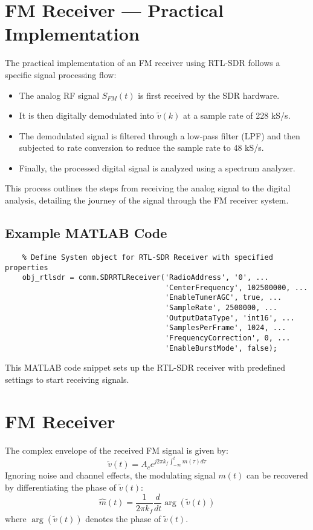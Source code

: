 \section*{FM Receiver — Practical Implementation}

The practical implementation of an FM receiver using RTL-SDR follows a specific signal processing flow:
\begin{itemize}
    \item The analog RF signal \( S_{FM}(t) \) is first received by the SDR hardware.
    \item It is then digitally demodulated into \( \tilde{v}(k) \) at a sample rate of 228 kS/s.
    \item The demodulated signal is filtered through a low-pass filter (LPF) and then subjected to rate conversion to reduce the sample rate to 48 kS/s.
    \item Finally, the processed digital signal is analyzed using a spectrum analyzer.
\end{itemize}
This process outlines the steps from receiving the analog signal to the digital analysis, detailing the journey of the signal through the FM receiver system.

\subsection*{Example MATLAB Code}
\begin{verbatim}
    % Define System object for RTL-SDR Receiver with specified properties
    obj_rtlsdr = comm.SDRRTLReceiver('RadioAddress', '0', ...
                                     'CenterFrequency', 102500000, ...
                                     'EnableTunerAGC', true, ...
                                     'SampleRate', 2500000, ...
                                     'OutputDataType', 'int16', ...
                                     'SamplesPerFrame', 1024, ...
                                     'FrequencyCorrection', 0, ...
                                     'EnableBurstMode', false);
\end{verbatim}
This MATLAB code snippet sets up the RTL-SDR receiver with predefined settings to start receiving signals.


\section*{FM Receiver}

The complex envelope of the received FM signal is given by:
\[
\tilde{v}(t) = A_c e^{j2\pi k_f \int_{-\infty}^{t} m(\tau) d\tau}
\]
Ignoring noise and channel effects, the modulating signal \( m(t) \) can be recovered by differentiating the phase of \( \tilde{v}(t) \):
\[
\hat{m}(t) = \frac{1}{2\pi k_f} \frac{d}{dt} \arg(\tilde{v}(t))
\]
where \( \arg(\tilde{v}(t)) \) denotes the phase of \( \tilde{v}(t) \).

